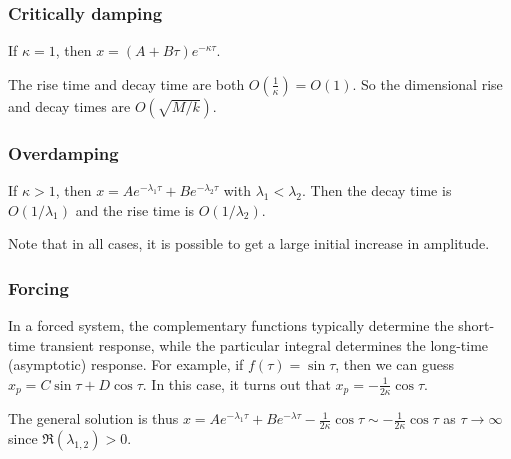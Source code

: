 \documentclass[a4paper]{article}
\begin{document}
\subsubsection*{Critically damping}
If $\kappa = 1$, then $x = (A + B\tau)e^{-\kappa\tau}$.

The rise time and decay time are both $O(\frac{1}{\kappa}) = O(1)$. So the dimensional rise and decay times are $O(\sqrt{M/k})$.
\begin{center}
\end{center}

\subsubsection*{Overdamping}
If $\kappa > 1$, then $x = Ae^{-\lambda_1\tau} + Be^{-\lambda_2\tau}$ with $\lambda_1 < \lambda_2$. Then the decay time is $O(1/\lambda_1)$ and the rise time is $O(1/\lambda_2)$.
\begin{center}
\end{center}
Note that in all cases, it is possible to get a large initial increase in amplitude.

\subsubsection*{Forcing}
In a forced system, the complementary functions typically determine the short-time transient response, while the particular integral determines the long-time (asymptotic) response.
For example, if $f(\tau) = \sin\tau$, then we can guess $x_p = C\sin \tau + D\cos\tau$. In this case, it turns out that $x_p = -\frac{1}{2\kappa}\cos\tau$.

The general solution is thus $x = Ae^{-\lambda_1\tau} + Be^{-\lambda \tau} - \frac{1}{2\kappa}\cos\tau \sim -\frac{1}{2\kappa}\cos\tau$ as $\tau\to \infty$ since $\Re (\lambda_{1, 2}) > 0$.
\end{document}
